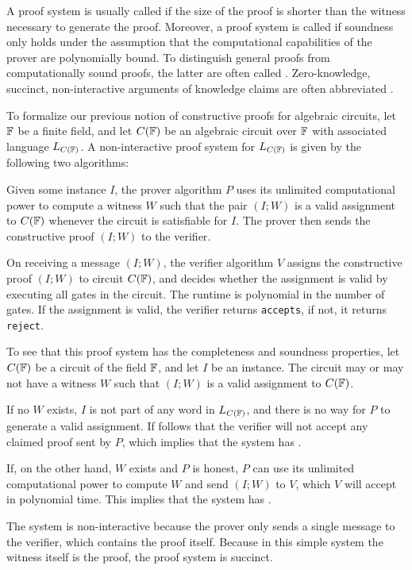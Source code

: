 A proof system is usually called  if the size of the proof is shorter than the witness necessary to generate the proof. Moreover, a proof system is called  if soundness only holds under the assumption that the computational capabilities of the prover are polynomially bound. To distinguish general proofs from computationally sound proofs, the latter are often called . Zero-knowledge, succinct, non-interactive arguments of knowledge claims are often abbreviated .
\begin{example} To formalize our previous notion of constructive proofs for algebraic circuits, let $\mathbb{F}$ be a finite field, and let $C(\mathbb{F})$ be an algebraic circuit over $\mathbb{F}$ with associated language $L_{C(\mathbb{F})}$. A non-interactive proof system for $L_{C(\mathbb{F})}$ is given by the following two algorithms:

Given some instance $I$, the prover algorithm $P$ uses its unlimited computational power to compute a witness $W$ such that the pair $(I;W)$ is a valid assignment to $C(\mathbb{F})$ whenever the circuit is satisfiable for $I$. The prover then sends the constructive proof $(I;W)$ to the verifier.

On receiving a message $(I;W)$, the verifier algorithm $V$ assigns the constructive proof $(I;W)$ to circuit $C(\mathbb{F})$, and decides whether the assignment is valid by executing all gates in the circuit. The runtime is polynomial in the number of gates. If the assignment is valid, the verifier returns \texttt{accepts}, if not, it returns \texttt{reject}. 

To see that this proof system has the completeness and soundness properties, let $C(\mathbb{F})$ be a circuit of the field $\mathbb{F}$, and let $I$ be an instance. The circuit may or may not have a witness $W$ such that  $(I;W)$ is a valid assignment to $C(\mathbb{F})$. 

If no $W$ exists, $I$ is not part of any word in $L_{C(\mathbb{F})}$, and there is no way for $P$ to generate a valid assignment. If follows that the verifier will not accept any claimed proof sent by $P$, which implies that the system has .

If, on the other hand, $W$ exists and $P$ is honest, $P$ can use its unlimited computational power to compute $W$ and send $(I;W)$ to $V$, which $V$ will accept in polynomial time. This implies that the system has .

The system is non-interactive because the prover only sends a single message to the verifier, which contains the proof itself. Because in this simple system the witness itself is the proof, the proof system is  succinct.
\end{example}
